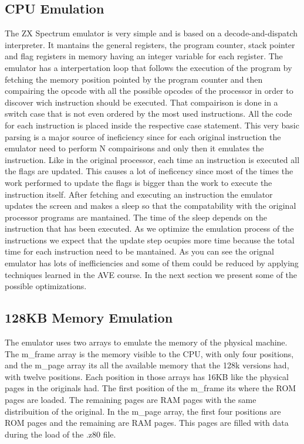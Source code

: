 \subsection{CPU Emulation}
The ZX Spectrum emulator is very simple and is based on a decode-and-dispatch interpreter. It mantains the general registers, the program counter, stack pointer and flag registers in memory having an integer variable for each register.
The emulator has a interpertation loop that follows the execution of the program by fetching the memory position pointed by the program counter and then compairing the opcode with all the possible opcodes of the processor in order to discover wich instruction should be executed. That compairison is done in a switch case that is not even ordered by the most used instructions. 
All the code for each instruction is placed inside the respective case statement. This very basic parsing is a major source of ineficiency since for each original instruction the emulator need to perform N compairisons and only then it emulates the instruction. 
Like in the original processor, each time an instruction is executed all the flags are updated. This causes a lot of ineficency since most of the times the work performed to update the flags is bigger than the work to execute the instruction itself.
After fetching and executing an instruction the emulator updates the screen and makes a sleep so that the compatability with the original processor programs are mantained. The time of the sleep depends on the instruction that has been executed. As we optimize the emulation process of the instructions we expect that the update step ocupies more time because the total time for each instruction need to be mantained.
As you can see the orignal emulator has lots of inefficiencies and some of them could be reduced by applying techniques learned in the AVE course. In the next section we present some of the possible optimizations.

\subsection{128KB Memory Emulation}
The emulator uses two arrays to emulate the memory of the physical machine. The m\_frame array is the memory visible to the CPU, with only four positions, and the m\_page array its all the available memory that the 128k versions had, with twelve positions. Each position in those arrays has 16KB like the physical pages in the originals had.
The first position of the m\_frame its where the ROM pages are loaded. The remaining pages are RAM pages with the same distribuition of the original. In the m\_page array, the first four positions are ROM pages and the remaining are RAM pages. This pages are filled with data during the load of the .z80 file.

